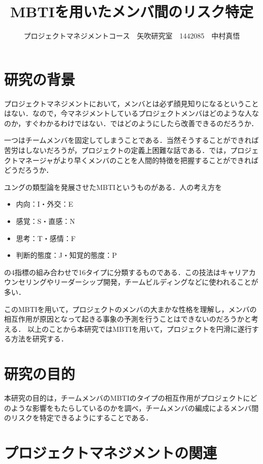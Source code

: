 \documentclass[uplatex,twocolumn,dvipdfmx]{jsarticle}
\title{\vspace{-5mm}\fontsize{14pt}{0pt}\selectfont MBTIを用いたメンバ間のリスク特定}
\author{\normalsize プロジェクトマネジメントコース　矢吹研究室　1442085　中村真悟}
\date{}
\begin{document}
\fontsize{10.5pt}{\baselineskip}\selectfont
\maketitle





\section{研究の背景}

プロジェクトマネジメントにおいて，メンバとは必ず顔見知りになるということはない．なので，今マネジメントしているプロジェクトメンバはどのような人なのか，すぐわかるわけではない．ではどのようにしたら改善できるのだろうか．

一つはチームメンバを固定してしまうことである．当然そうすることができれば苦労はしないだろうが，プロジェクトの定義上困難な話である．では，プロジェクトマネージャがより早くメンバのことを人間的特徴を把握することができればどうだろうか．

ユングの類型論を発展させたMBTIというものがある．人の考え方を
\begin{itemize}
 \item 内向：I・外交：E
 \item 感覚：S・直感：N
 \item 思考：T・感情：F
 \item 判断的態度：J・知覚的態度：P
\end{itemize}
の4指標の組み合わせで16タイプに分類するものである．この技法はキャリアカウンセリングやリーダーシップ開発，チームビルディングなどに使われることが多い．

このMBTIを用いて，プロジェクトのメンバの大まかな性格を理解し，メンバの相互作用が原因となって起きる事象の予測を行うことはできないのだろうかと考える．
以上のことから本研究ではMBTIを用いて，プロジェクトを円滑に遂行する方法を研究する．

\section{研究の目的}

本研究の目的は，チームメンバのMBTIのタイプの相互作用がプロジェクトにどのような影響をもたらしているのかを調べ，チームメンバの編成によるメンバ間のリスクを特定できるようにすることである．

\section{プロジェクトマネジメントの関連}
\end{document}
